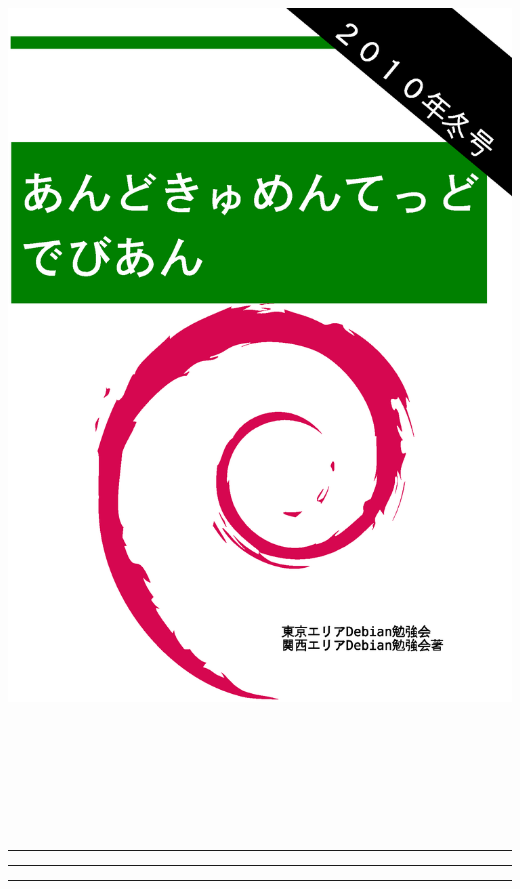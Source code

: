 \documentclass[mingoth,a4paper]{jsarticle}
\begin{document}
\begin{titlepage}
\includegraphics[height=252mm]{image2010-fuyu/2010-winter.eps}
\end{titlepage}

\setcounter{page}{1}
\begin{minipage}[]{0.2\hsize}
 \colorbox{dancerlightblue}{}
\end{minipage}
\begin{minipage}[]{0.8\hsize}
\hrule
\vspace{1mm}
\hrule
\setcounter{tocdepth}{1}
{\small
 \tableofcontents}
\vspace{1mm}
\hrule
\vspace{3cm}

\end{minipage}
\end{document}
